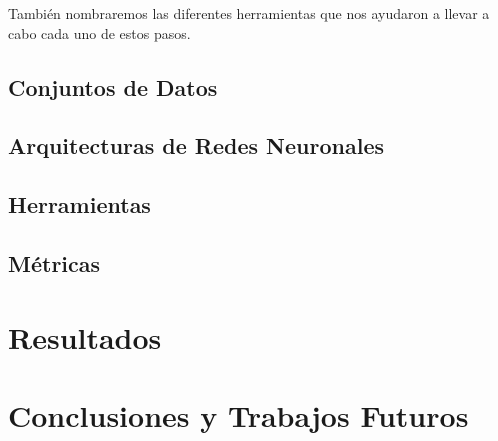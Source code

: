 \documentclass[a4paper,12pt,spanish]{book}
\begin{document}
También nombraremos las diferentes herramientas que nos ayudaron a llevar a cabo
cada uno de estos pasos.

\section{Conjuntos de Datos}


\section{Arquitecturas de Redes Neuronales}


\section{Herramientas}


\section{Métricas}


\chapter{Resultados}


\chapter{Conclusiones y Trabajos Futuros}

\newpage
\footnotesize
% 
% 
\nocite{python-docs}
\nocite{jupyter-docs}
\nocite{nabu}
\nocite{numpy-docs}
\nocite{pandas-docs}
\nocite{pytorch-docs}
\nocite{mlflow-docs}
\nocite{optuna-docs}
\printbibliography

\newpage
\newpage
\vfill
\addtocounter{page}{-1}
\clearpage
\thispagestyle{empty}
\phantom{a}
\vfill
\newpage
\vfill
\addtocounter{page}{-1}
\end{document}
